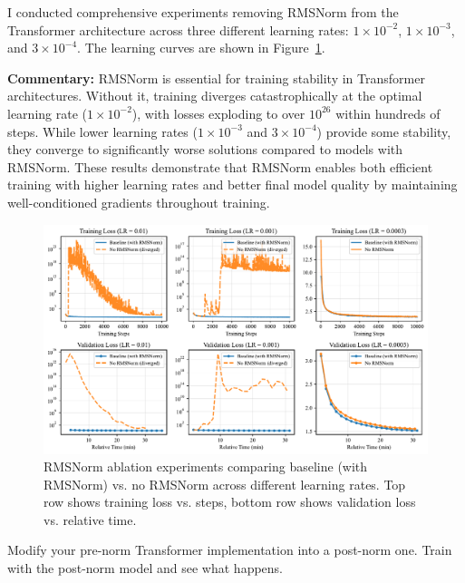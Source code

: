 \begin{answer}

I conducted comprehensive experiments removing RMSNorm from the Transformer architecture across three different learning rates: $1 \times 10^{-2}$, $1 \times 10^{-3}$, and $3 \times 10^{-4}$. The learning curves are shown in Figure~\ref{fig:rmsnorm_ablation_experiments}.

\textbf{Commentary:} RMSNorm is essential for training stability in Transformer architectures. Without it, training diverges catastrophically at the optimal learning rate ($1 \times 10^{-2}$), with losses exploding to over $10^{26}$ within hundreds of steps. While lower learning rates ($1 \times 10^{-3}$ and $3 \times 10^{-4}$) provide some stability, they converge to significantly worse solutions compared to models with RMSNorm. These results demonstrate that RMSNorm enables both efficient training with higher learning rates and better final model quality by maintaining well-conditioned gradients throughout training.

\begin{figure}[!htb]
    \centering
    \includegraphics[width=\textwidth]{images/rmsnorm_ablation_experiments.pdf}
    \caption{RMSNorm ablation experiments comparing baseline (with RMSNorm) vs. no RMSNorm across different learning rates. Top row shows training loss vs. steps, bottom row shows validation loss vs. relative time.}
    \label{fig:rmsnorm_ablation_experiments}
\end{figure}

\end{answer}


Modify your pre-norm Transformer implementation into a post-norm one. Train with the post-norm model and see what happens.

